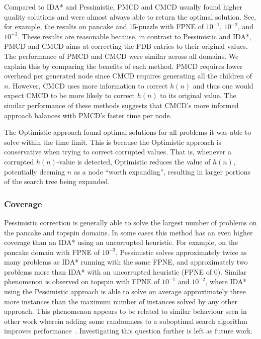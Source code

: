 \documentclass[letterpaper]{article}
\begin{document}
Compared to IDA* and Pessimistic, PMCD and CMCD usually found higher quality solutions  and were almost always able to return the optimal solution. See, for example, the results on pancake and 15-puzzle with FPNE of $10^{-1}$, $10^{-2}$, and $10^{-3}$. These results are reasonable because, in contrast to Pessimistic and IDA*, PMCD and CMCD aims at correcting the PDB entries to their original values. %
%
The performance of PMCD and CMCD were similar across all domains. We explain this by comparing the benefits of each method. PMCD requires lower overhead per generated node since CMCD requires generating all the children of $n$. However, CMCD uses more information to correct $h(n)$ and thus one would expect CMCD to be more likely to correct $h(n)$ to its original value. The similar performance of these methods suggests that CMCD's more informed approach balances with PMCD's faster time per node.

The Optimistic approach found optimal solutions for all problems it was able to solve within the time limit. This is because the Optimistic approach is conservative when trying to correct corrupted values. That is, whenever a corrupted $h(n)$-value is detected, Optimistic reduces the value of $h(n)$, potentially deeming $n$ as a node ``worth expanding'', resulting in larger portions of the search tree being expanded. 


\subsubsection{Coverage}

Pessimistic correction is generally able to solve the largest number of problems on the pancake and topspin domains. In some cases this method has an even higher coverage than an IDA* using an uncorrupted heuristic. For example, on the pancake domain with FPNE of $10^{-3}$, Pessimistic solves approximately twice as many problems as IDA* running with the same FPNE, and approximately two problems more than IDA* with an uncorrupted heuristic (FPNE of $0$). %
Similar phenomenon is observed on topspin with FPNE of $10^{-1}$ and $10^{-2}$, where IDA* using the Pessimistic approach is able to solve on average approximately three more instances than the maximum number of instances solved by any other approach. 
This phenomenon appears to be related to similar behaviour seen in other work wherein  adding some randomness to a suboptimal search algorithm improves performance~\cite{valenzano2014comparison}. Investigating this question further is left as future work. 
\end{document}
